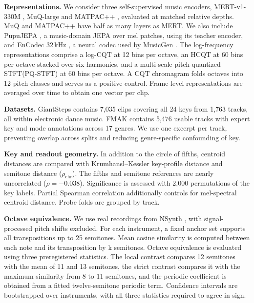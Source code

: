 \documentclass{article}
\begin{document}
\noindent\textbf{Representations.} We consider three self-supervised music encoders,
MERT-v1-330M \cite{mert}, MuQ-large \cite{muq} and MATPAC++ \cite{matpac}, evaluated at matched relative depths. MuQ and MATPAC++ have half as many layers as MERT. We also include PupuJEPA \cite{pupujepa}, a music-domain JEPA over mel patches, using its teacher encoder, and EnCodec 32\,kHz \cite{encodec}, a neural codec used by MusicGen  \cite{musicgen}. The log-frequency representations comprise a log-CQT \cite{brown1991,librosa} at 12 bins per octave, an HCQT \cite{hcqt} at 60 bins per octave stacked over six harmonics, and a multi-scale pitch-quantized STFT(PQ-STFT) at 60 bins per octave. A CQT chromagram \cite{librosa} folds octaves into 12 pitch classes and serves as a positive control. Frame-level representations are averaged over time to obtain one vector per clip.

\noindent\textbf{Datasets.} GiantSteps \cite{giantsteps} contains 7,035 clips covering all 24 keys from 1,763 tracks, all within electronic dance music. FMAK \cite{fmak} contains 5,476 usable tracks with expert key and mode annotations across 17 genres. We use one excerpt per track, preventing overlap across splits and reducing genre-specific confounding of key.

\noindent\textbf{Key and readout geometry.} In addition to the circle of fifths, centroid distances are compared with Krumhansl–Kessler key-profile distance and semitone distance ($\rho_{\text{chr}}$). The fifths and semitone references are nearly uncorrelated ($\rho=-0.038$). Significance is assessed with 2,000 permutations of the key labels. Partial Spearman correlation additionally controls for mel-spectral centroid distance. Probe folds are grouped by track.

\noindent\textbf{Octave equivalence.} We use real recordings from NSynth \cite{nsynth}, with signal-processed pitch shifts excluded. For each instrument, a fixed anchor set supports all transpositions up to 25 semitones. Mean cosine similarity is computed between each note and its transposition by k semitones. Octave equivalence is evaluated using three preregistered statistics. The local contrast compares 12 semitones with the mean of 11 and 13 semitones, the strict contrast compares it with the maximum similarity from 8 to 11 semitones, and the periodic coefficient is obtained from a fitted twelve-semitone periodic term. Confidence intervals are bootstrapped over instruments, with all three statistics required to agree in sign.
\end{document}
